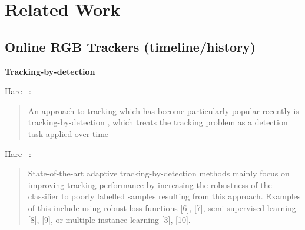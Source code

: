 \chapter{Related Work}


\section{Online RGB Trackers (timeline/history)}

\textbf{Tracking-by-detection}

Hare \etal~\cite{hare2014struck}:

\blockquote{An approach to tracking which has become particularly
popular recently is tracking-by-detection \cite{avidan2004support}, which treats
the tracking problem as a detection task applied over time}

Hare \etal~\cite{hare2014struck}:
\blockquote{State-of-the-art adaptive tracking-by-detection methods mainly
focus on improving tracking performance by increasing
the robustness of the classifier to poorly labelled samples
resulting from this approach. Examples of this include using
robust loss functions [6], [7], semi-supervised learning [8],
[9], or multiple-instance learning [3], [10].} 


